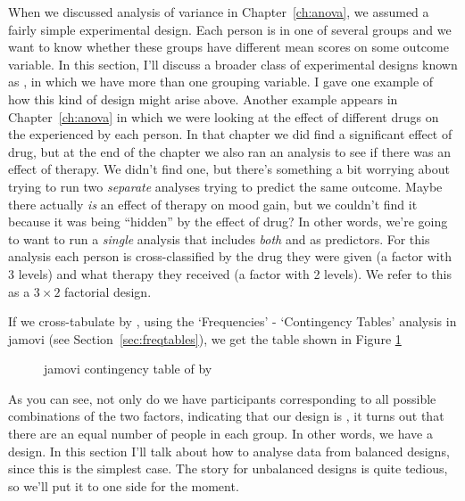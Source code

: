 When we discussed analysis of variance in Chapter~\ref{ch:anova}, we assumed a fairly simple experimental design. Each person is in one of several groups and we want to know whether these groups have different mean scores on some outcome variable. In this section, I'll discuss a broader class of experimental designs known as , in which we have more than one grouping variable. I gave one example of how this kind of design might arise above. Another example appears in  Chapter~\ref{ch:anova} in which we were looking at the effect of different drugs on the  experienced by each person. In that chapter we did find a significant effect of drug, but at the end of the chapter we also ran an analysis to see if there was an effect of therapy. We didn't find one, but there's something a bit worrying about trying to run two {\it separate} analyses trying to predict the same outcome. Maybe there actually {\it is} an effect of therapy on mood gain, but we couldn't find it because it was being ``hidden'' by the effect of drug? In other words, we're going to want to run a {\it single} analysis that includes {\it both}  and  as predictors. For this analysis each person is cross-classified by the drug they were given (a factor with 3 levels) and what therapy they received (a factor with 2 levels). We refer to this as a $3 \times 2$ factorial design. 

If we cross-tabulate  by , using the `Frequencies' - `Contingency Tables' analysis in jamovi (see Section~\ref{sec:freqtables}), we get the table shown in Figure \ref{fig:factorialanova1}

\begin{figure}[!htb]
\begin{center}
\caption{jamovi contingency table of  by }
\label{fig:factorialanova1}
\HR
\end{center}
\end{figure}

As you can see, not only do we have participants corresponding to all possible combinations of the two factors, indicating that our design is , it turns out that there are an equal number of people in each group. In other words, we have a  design. In this section I'll talk about how to analyse data from balanced designs, since this is the simplest case. The story for unbalanced designs is quite tedious, so we'll put it to one side for the moment.

